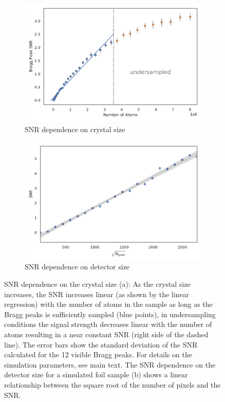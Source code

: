 \begin{figure}
	\centering
	\begin{subfigure}[b]{0.45\textwidth}
		\includegraphics[width=\linewidth]{images/SNRNatoms.pdf}
		\caption{ SNR dependence on crystal size}
		\label{fig:SNRNatoms}
	\end{subfigure}
	\hspace{0.02\textwidth}
	\begin{subfigure}[b]{0.45\textwidth}
		\includegraphics[width=\linewidth]{images/detsize.pdf}
		\caption{SNR dependence on detector size}
		\label{fig:SNRdetsize}
	\end{subfigure}
\caption[SNR dependence on crystal size and detector size]{SNR dependence on the crystal size (a): As the crystal size increases, the SNR increases linear (as shown by the linear regression) with the number of atoms in the sample as long as the Bragg peaks is sufficiently sampled (blue points), in undersampling conditions the signal strength decreases linear with the number of atoms resulting in a near constant SNR (right side of the dashed line). The error bars show the standard deviation of the SNR calculated for the 12 visible Bragg peaks. For details on the simulation parameters, see main text. The SNR dependence on the detector size for a simulated foil sample (b) shows a linear relationship between the square root of the number of pixels and the SNR.}

\end{figure}


